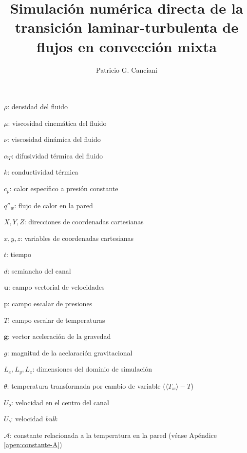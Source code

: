 \documentclass[12pt,screen,twoside]{ibtesis}
\title{Simulación numérica directa de la transición laminar-turbulenta de flujos en convección mixta}
\author{Patricio G. Canciani}
\begin{document}

\begin{preliminary}



\begin{abreviaturas}
\begin{itemize}
\small{ \small{

\item[] $\rho$: densidad del fluido 
\item[] $\mu$: viscosidad cinemática del fluido 
\item[] $\nu$: viscosidad dinámica del fluido
\item[] $\alpha_{T}$: difusividad térmica del fluido 
\item[] $k$: conductividad térmica 
\item[] $c_p$: calor específico a presión constante 
\item[] $q''_w$: flujo de calor en la pared 
\item[] $X,Y,Z$: direcciones de coordenadas cartesianas 
\item[] $x,y,z$: variables de coordenadas cartesianas 
\item[] $t$: tiempo 
\item[] $d$: semiancho del canal 
\item[] $\mathbf{u}$: campo vectorial de velocidades 
\item[] $\text{p}$: campo escalar de presiones 
\item[] $T$: campo escalar de temperaturas 
\item[] $\mathbf{g}$: vector aceleración de la gravedad
\item[] $g$: magnitud de la acelaración gravitacional 
\item[] $L_x,L_y,L_z$: dimensiones del dominio de simulación 
\item[] $\theta$: temperatura transformada por cambio de variable ($\langle T_w \rangle - T$)

\item[] $U_o$: velocidad en el centro del canal 
\item[] $U_b$: velocidad \textit{bulk} 
\item[] $\mathcal{A}$: constante relacionada a la temperatura en la pared (véase Apéndice \ref{apen:constante-A}) 

}}
\end{itemize}
\end{abreviaturas}
\end{preliminary}
\end{document}
